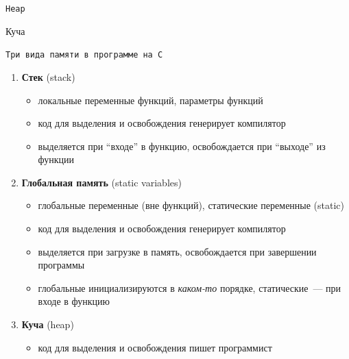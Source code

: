 \documentclass[pdf, 10pt, unicode]{beamer}
\begin{document}
\begin{frame}[fragile]{{\tt Heap}}
\begin{center}
\begin{huge}Куча\end{huge}
\end{center}
\end{frame}

\begin{frame}[fragile]{{\tt Три вида памяти в программе на C}}

\begin{enumerate}
  \item \textbf{Стек} (stack)
    \begin{itemize}
        \item локальные переменные функций, параметры функций
        \item код для выделения и освобождения генерирует компилятор
        \item выделяется при ``входе'' в функцию, освобождается при ``выходе'' из функции
    \end{itemize}
  \item \textbf{Глобальная память} (static variables)
    \begin{itemize}
        \item глобальные переменные (вне функций), статические переменные (static)
        \item код для выделения и освобождения генерирует компилятор
        \item выделяется при загрузке в память, освобождается при завершении программы
        \item глобальные инициализируются в \textit{каком-то} порядке,
              статические~--- при входе в функцию
    \end{itemize}

  \item \textbf{Куча} (heap)
    \begin{itemize}
        \item код для выделения и освобождения пишет программист
    \end{itemize}

\end{enumerate}

\end{frame}
\end{document}
